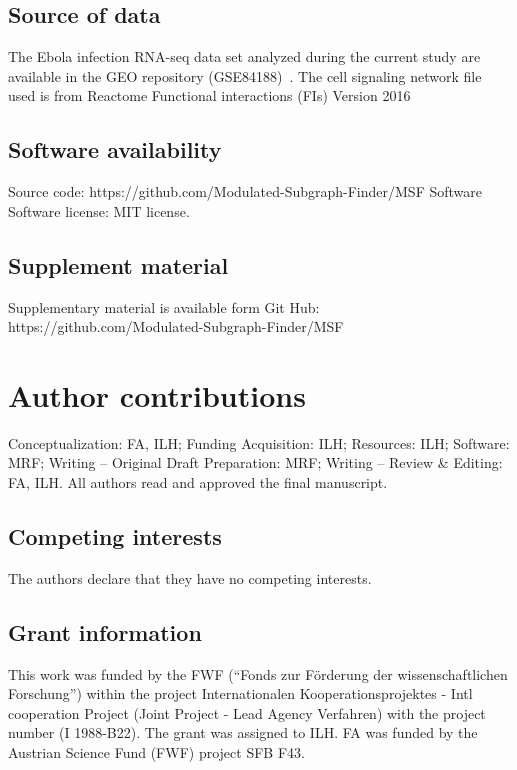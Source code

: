 \documentclass[10pt,a4paper,twocolumn]{article}
\begin{document}
	\subsection*{Source of data}
	
	The Ebola infection RNA-seq data set analyzed during the
        current study are available in the GEO repository
        (GSE84188)~\cite{Olejnik}. The cell signaling network file
        used is from Reactome Functional interactions (FIs) Version
        2016~\cite{Cytokegg}
	
	\subsection*{Software availability}
	
	\noindent
	Source code: \newline
	https://github.com/Modulated-Subgraph-Finder/MSF \newline Software
	Software license: MIT license.
	
	\subsection*{Supplement material}
	Supplementary material is available form Git Hub: https://github.com/Modulated-Subgraph-Finder/MSF
	
	\section*{Author contributions}
	Conceptualization: FA, ILH; Funding Acquisition: ILH; Resources: ILH;
	Software: MRF; Writing – Original Draft Preparation: MRF; Writing – Review
	\& Editing: FA, ILH. All authors read and approved the final manuscript.
	
	\subsection*{Competing interests}
	
	The authors declare that they have no competing interests.
	
	\subsection*{Grant information}
	
	This work was funded by the FWF (“Fonds zur F{\"o}rderung der
        wissenschaftlichen Forschung”) within the project
        Internationalen Kooperationsprojektes - Intl cooperation
        Project (Joint Project - Lead Agency Verfahren) with the
        project number (I 1988-B22). The grant was assigned to ILH. FA
        was funded by the Austrian Science Fund (FWF) project SFB F43.
	
\end{document}
